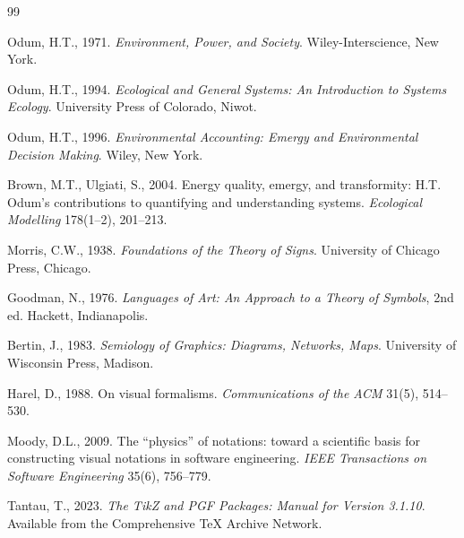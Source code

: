 \begin{thebibliography}{99}

Odum, H.T., 1971. \emph{Environment, Power, and Society}. Wiley-Interscience,
New York.

Odum, H.T., 1994. \emph{Ecological and General Systems: An Introduction to
Systems Ecology}. University Press of Colorado, Niwot.

Odum, H.T., 1996. \emph{Environmental Accounting: Emergy and Environmental
Decision Making}. Wiley, New York.

Brown, M.T., Ulgiati, S., 2004. Energy quality, emergy, and transformity:
H.T. Odum's contributions to quantifying and understanding systems.
\emph{Ecological Modelling} 178(1--2), 201--213.

Morris, C.W., 1938. \emph{Foundations of the Theory of Signs}. University of
Chicago Press, Chicago.

Goodman, N., 1976. \emph{Languages of Art: An Approach to a Theory of Symbols},
2nd ed. Hackett, Indianapolis.

Bertin, J., 1983. \emph{Semiology of Graphics: Diagrams, Networks, Maps}.
University of Wisconsin Press, Madison.

Harel, D., 1988. On visual formalisms. \emph{Communications of the ACM} 31(5),
514--530.

Moody, D.L., 2009. The ``physics'' of notations: toward a scientific basis for
constructing visual notations in software engineering. \emph{IEEE Transactions
on Software Engineering} 35(6), 756--779.

Tantau, T., 2023. \emph{The Ti\emph{k}Z and PGF Packages: Manual for Version
3.1.10}. Available from the Comprehensive TeX Archive Network.


\end{thebibliography}
